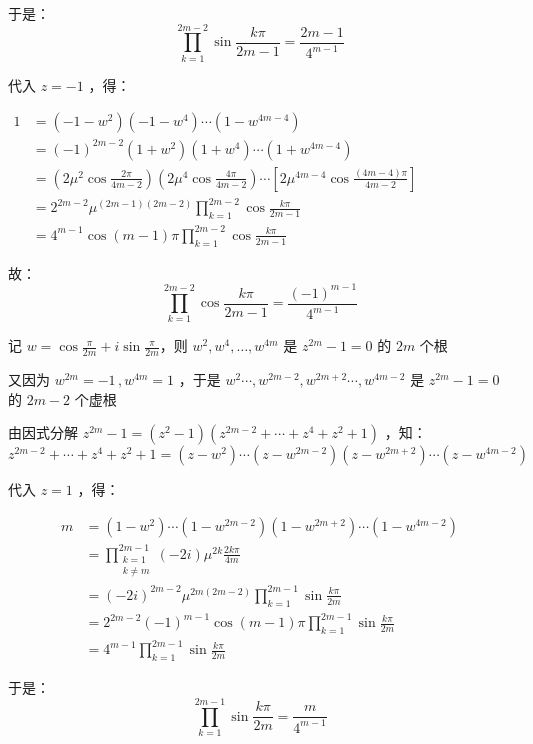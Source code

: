 于是： 
\begin{equation}\label{TriCom_eq2}%
\prod_{k=1}^{2m-2}\sin\frac{k\pi}{2m-1}=\frac{2m-1}{4^{m-1}}
\end{equation}

代入 $z=-1$ ，得：

$\begin{aligned} 1&=(-1-w^2)(-1-w^4)\cdots(1-w^{4m-4})\\ &=(-1)^{2m-2}(1+w^2)(1+w^4)\cdots(1+w^{4m-4})\\ &=\left(2\mu^2\cos\frac{2\pi}{4m-2}\right)\left(2\mu^4\cos\frac{4\pi}{4m-2}\right)\cdots\left[2\mu^{4m-4}\cos\frac{(4m-4)\pi}{4m-2}\right]\\ &=2^{2m-2}\mu^{(2m-1)(2m-2)}\prod_{k=1}^{2m-2}\cos\frac{k\pi}{2m-1}\\ &=4^{m-1}\cos(m-1)\pi\prod_{k=1}^{2m-2}\cos\frac{k\pi}{2m-1} \end{aligned}$ 

故：
\begin{equation}%
\prod_{k=1}^{2m-2}\cos\frac{k\pi}{2m-1}=\frac{(-1)^{m-1}}{4^{m-1}} 
\end{equation}

记 $\displaystyle{w=\cos\frac{\pi}{2m}+i\sin\frac{\pi}{2m}}$，则 $w^2,w^4,\dots ,w^{4m}$ 是 $z^{2m}-1=0$ 的 $2m$ 个根

又因为 $w^{2m}=-1\,,w^{4m}=1$ ，于是 $w^2\cdots,w^{2m-2},w^{2m+2}\cdots,w^{4m-2}$ 是 $z^{2m}-1=0$ 的 $2m-2$ 个虚根

由因式分解 $z^{2m}-1=(z^2-1)(z^{2m-2}+\cdots+z^4+z^2+1)$ ，知：
$$z^{2m-2}+\cdots+z^4+z^2+1=(z-w^2)\cdots(z-w^{2m-2})(z-w^{2m+2})\cdots(z-w^{4m-2})$$

代入 $z=1$ ，得：

$$\begin{aligned} m&=(1-w^2)\cdots(1-w^{2m-2})(1-w^{2m+2})\cdots(1-w^{4m-2})\\ &=\prod_{\substack{k=1\\k\neq m}}^{2m-1}(-2i)\mu^{2k}\frac{2k\pi}{4m}\\ &=(-2i)^{2m-2}\mu^{2m(2m-2)}\prod_{k=1}^{2m-1}\sin\frac{k\pi}{2m}\\ &=2^{2m-2}(-1)^{m-1}\cos(m-1)\pi\prod_{k=1}^{2m-1}\sin\frac{k\pi}{2m}\\ &=4^{m-1}\prod_{k=1}^{2m-1}\sin\frac{k\pi}{2m} \end{aligned}$$

于是：
\begin{equation}\label{TriCom_eq3}%
\prod_{k=1}^{2m-1}\sin\frac{k\pi}{2m}=\frac{m}{4^{m-1}}
\end{equation}

